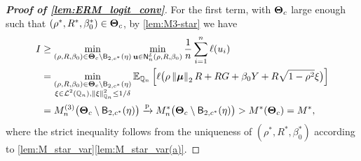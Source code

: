 \begin{proof}[\textbf{Proof of \cref{lem:ERM_logit_conv}}]
For the first term, with $\text{\boldmath $\Theta$}_{c}$ large enough such that $(\rho^*, R^*, \beta^*_0) \in \text{\boldmath $\Theta$}_{c}$, by \cref{lem:M3-star} we have
\begin{align*}
        I 
        & \ge    
        \min_{(\rho, R, \beta_0) \in \text{\boldmath $\Theta$}_{c} \setminus \mathsf{B}_{2,c^*}(\eta) }
        \min_{\mathrm{\bf u} \in 
    \mathsf{N}^\delta_n(\rho, R, \beta_0)  }
    \frac1n \sum_{i=1}^n \ell(u_i) 
       \\
       & =  \min_{ \substack{ (\rho, R, \beta_0) \in \text{\boldmath $\Theta$}_{c} \setminus \mathsf{B}_{2,c^*}(\eta) 
       \\ \xi \in \mathcal{L}^2(\mathbb{Q}_n), \left\|{\xi}\right\|^2_{\mathbb{Q}_n} \le 1/\delta } } 
       \mathbb{E}_{\mathbb{Q}_n} \left[ \ell \bigl( \rho\left\|{{\boldsymbol{\mu}}}\right\|_2 R + RG + \beta_0 Y + R\sqrt{1 - \rho^2} \xi \bigr) \right] \\
       & =  M_n^{(3)}\bigl( \text{\boldmath $\Theta$}_{c} \setminus \mathsf{B}_{2,c^*}(\eta) \bigr)
       \xrightarrow{\mathrm{p}}  
       M_n^*\bigl( \text{\boldmath $\Theta$}_{c} \setminus \mathsf{B}_{2,c^*}(\eta) \bigr) >  M^*( \text{\boldmath $\Theta$}_{c} ) = M^*,
\end{align*}
where the strict inequality follows from the uniqueness of $(\rho^*, R^*, \beta^*_0)$ according to \cref{lem:M_star_var}\ref{lem:M_star_var(a)}.




\end{proof}
